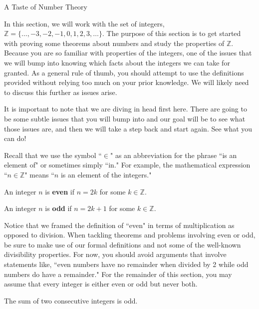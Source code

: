 \begin{section}{A Taste of Number Theory}\label{sec:baby number theory}

In this section, we will work with the set of integers, $\mathbb{Z} = \{\ldots, -3, -2, -1, 0, 1, 2, 3, \ldots\}$.  The purpose of this section is to get started with proving some theorems about numbers and study the properties of $\mathbb{Z}$. Because you are so familiar with properties of the integers, one of the issues that we will bump into knowing which facts about the integers we can take for granted.  As a general rule of thumb, you should attempt to use the definitions provided without relying too much on your prior knowledge.  We will likely need to discuss this further as issues arise.

It is important to note that we are diving in head first here.  There are going to be some subtle issues that you will bump into and our goal will be to see what those issues are, and then we will take a step back and start again.  See what you can do!

Recall that we use the symbol ``$\in$" as an abbreviation for the phrase ``is an element of" or sometimes simply ``in."  For example, the mathematical expression ``$n\in\mathbb{Z}$" means ``$n$ is an element of the integers."

\begin{definition}
An integer $n$ is \textbf{even} if $n=2k$ for some $k\in\mathbb{Z}$.
\end{definition}

\begin{definition}
An integer $n$ is \textbf{odd} if $n=2k+1$ for some $k\in\mathbb{Z}$.
\end{definition}

Notice that we framed the definition of ``even" in terms of multiplication as opposed to division. When tackling theorems and problems involving even or odd, be sure to make use of our formal definitions and not some of the well-known divisibility properties.  For now, you should avoid arguments that involve statements like, ``even numbers have no remainder when divided by 2 while odd numbers do have a remainder." For the remainder of this section, you may assume that every integer is either even or odd but never both.

\begin{theorem}\label{thm:two consecutive ints}
The sum of two consecutive integers is odd.
\end{theorem}


\end{section}

